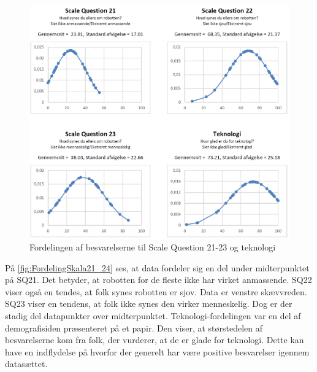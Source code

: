 \begin{figure}[H]
\centering
\includegraphics[width =\textwidth]{Figure/DatabehandlingSkalaer/FordelingSkala21_24} 
\caption{Fordelingen af besvarelserne til Scale Question 21-23 og teknologi}
\label{fig:FordelingSkala21_24}
\end{figure}
\noindent
%
På \autoref{fig:FordelingSkala21_24} ses, at data fordeler sig en del under midterpunktet på SQ21. Det betyder, at robotten for de fleste ikke har virket anmassende. SQ22 viser også en tendes, at folk synes robotten er sjov. Data er venstre skævvreden.  SQ23 viser en tendens, at folk ikke synes den virker menneskelig. Dog er der stadig del datapunkter over midterpunktet. Teknologi-fordelingen var en del af demografisiden præsenteret på et papir. Den viser, at størstedelen af besvarelserne kom fra folk, der vurderer, at de er glade for teknologi. Dette kan have en indflydelse på hvorfor der generelt har være positive besvarelser igennem datasættet. 